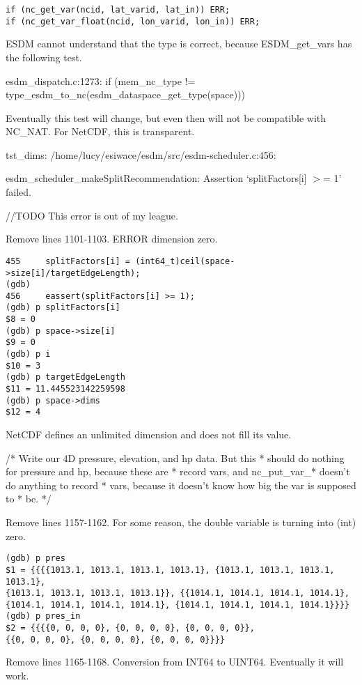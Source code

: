 \begin{verbatim}
if (nc_get_var(ncid, lat_varid, lat_in)) ERR;
if (nc_get_var_float(ncid, lon_varid, lon_in)) ERR;
\end{verbatim}

ESDM cannot understand that the type is correct, because ESDM\_get\_vars has the following test.

esdm\_dispatch.c:1273: if (mem\_nc\_type != type\_esdm\_to\_nc(esdm\_dataspace\_get\_type(space)))

Eventually this test will change, but even then will not be compatible with NC\_NAT. For NetCDF, this is transparent.

tst\_dims: /home/lucy/esiwace/esdm/src/esdm-scheduler.c:456:

esdm\_scheduler\_makeSplitRecommendation: Assertion `splitFactors[i] $>$= 1' failed.

//TODO This error is out of my league.

Remove lines 1101-1103. ERROR dimension zero.

\begin{verbatim}
455	    splitFactors[i] = (int64_t)ceil(space->size[i]/targetEdgeLength);
(gdb)
456	    eassert(splitFactors[i] >= 1);
(gdb) p splitFactors[i]
$8 = 0
(gdb) p space->size[i]
$9 = 0
(gdb) p i
$10 = 3
(gdb) p targetEdgeLength
$11 = 11.445523142259598
(gdb) p space->dims
$12 = 4
\end{verbatim}

NetCDF defines an unlimited dimension and does not fill its value.

/* Write our 4D pressure, elevation, and hp data. But this
 * should do nothing for pressure and hp, because these are
 * record vars, and nc\_put\_var\_* doesn't do anything to record
 * vars, because it doesn't know how big the var is supposed to
 * be. */

Remove lines 1157-1162. For some reason, the double variable is turning into (int) zero.

\begin{verbatim}
(gdb) p pres
$1 = {{{{1013.1, 1013.1, 1013.1, 1013.1}, {1013.1, 1013.1, 1013.1, 1013.1},
{1013.1, 1013.1, 1013.1, 1013.1}}, {{1014.1, 1014.1, 1014.1, 1014.1},
{1014.1, 1014.1, 1014.1, 1014.1}, {1014.1, 1014.1, 1014.1, 1014.1}}}}
(gdb) p pres_in
$2 = {{{{0, 0, 0, 0}, {0, 0, 0, 0}, {0, 0, 0, 0}},
{{0, 0, 0, 0}, {0, 0, 0, 0}, {0, 0, 0, 0}}}}
\end{verbatim}

Remove lines 1165-1168. Conversion from INT64 to UINT64. Eventually it will work.

